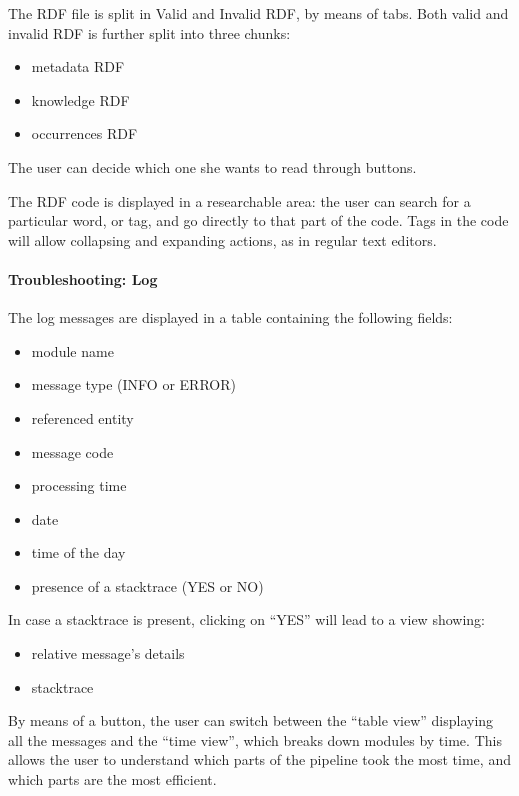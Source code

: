 \documentclass[12pt,oneside,svgnames]{memoir}
\begin{document}
The RDF file is split in Valid and Invalid RDF, by means of tabs. Both
valid and invalid RDF is further split into three chunks:

\begin{itemize}
\itemsep1pt\parskip0pt
\item
  metadata RDF
\item
  knowledge RDF
\item
  occurrences RDF
\end{itemize}

The user can decide which one she wants to read through buttons.

The RDF code is displayed in a researchable area: the user can search
for a particular word, or tag, and go directly to that part of the code.
Tags in the code will allow collapsing and expanding actions, as in
regular text editors.

\paragraph*{Troubleshooting: Log}\label{troubleshooting-log}

The log messages are displayed in a table containing the following
fields:

\begin{itemize}
\itemsep1pt\parskip0pt
\item
  module name
\item
  message type (INFO or ERROR)
\item
  referenced entity
\item
  message code
\item
  processing time
\item
  date
\item
  time of the day
\item
  presence of a stacktrace (YES or NO)
\end{itemize}

In case a stacktrace is present, clicking on ``YES'' will lead to a view
showing:

\begin{itemize}
\itemsep1pt\parskip0pt
\item
  relative message's details
\item
  stacktrace
\end{itemize}

By means of a button, the user can switch between the ``table view''
displaying all the messages and the ``time view'', which breaks down
modules by time. This allows the user to understand which parts of the
pipeline took the most time, and which parts are the most efficient.
\end{document}
